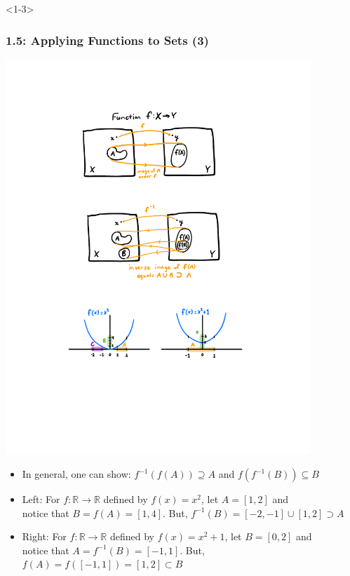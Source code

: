 \documentclass[10pt,english,aspectratio=169,handout]{beamer}
\begin{document}
\begin{frame}<1-3> \frametitle{1.5: Applying Functions to Sets (3)}

\vspace{-2mm}
\begin{center}
\includegraphics[width=115mm]{figures/ch1_set_image_ex}
\end{center}
\vspace{-2mm}

\begin{itemize}
    \setlength\itemsep{3mm}
    \item<1-> In general, one can show: $f^{-1}(f(A)) \supseteq A$ and $f(f^{-1}(B)) \subseteq B$
    \item<2-> Left: For $f \colon \mathbb{R} \rightarrow \mathbb{R}$ defined by $f(x)=x^2$, let $A=[1,2]$ and \\ notice that $B = f(A) = [1,4]$.  But, $f^{-1}(B) = [-2,-1] \cup [1,2] \supset A$
    \item<3-> Right: For $f \colon \mathbb{R} \rightarrow \mathbb{R}$ defined by $f(x)=x^2+1$, let $B=[0,2]$ and \\ notice that $A = f^{-1}(B) = [-1,1]$.  But, $f(A) = f([-1,1]) = [1,2] \subset B$
\end{itemize}
 

 
 \end{frame}  
 
\end{document}
